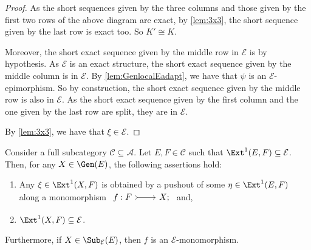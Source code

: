 \begin{proof}
As the short sequences given by the three columns and those given by the first two rows of the above diagram are exact, by \cref{lem:3x3}, the short sequence given by the last row is exact too. So $K' \cong K$. 

Moreover, the short exact sequence given by the middle row in $\mathcal{E}$ is by hypothesis. As $\mathcal{E}$ is an exact structure, the short exact sequence given by the middle column is in $\mathcal{E}$. By \cref{lem:GenlocalEadapt}, we have that $\psi$ is an $\mathcal{E}$-epimorphism. So by construction, the short exact sequence given by the middle row is also in $\mathcal{E}$. As the short exact sequence given by the first column and the one given by the last row are split, they are in $\mathcal{E}$.

By \cref{lem:3x3}, we have that $\xi \in {\mathcal{E}}$. 
\end{proof}

\begin{lemma}
\label{lem:SublocalEadapt}
Consider a full subcategory $\mathscr{C} \subseteq \mathscr{A}$. Let $E,F \in \mathscr{C}$ such that $\Ext^1(E,F) \subseteq \mathcal{E}$. Then, for any $X \in \Gen(E)$, the following assertions hold:
\begin{enumerate}[label=$(\alph*)$,itemsep=1mm]
   \item Any $\xi \in \Ext^1(X,F)$ is obtained by a pushout of some $\eta \in \Ext^1(E,F)$ along a monomorphism $ \begin{tikzcd}
	 f: F & X;
	\arrow[tail,from=1-1, to=1-2]
   \end{tikzcd}$ and,
   \item $\Ext^1(X,F) \subseteq \mathcal{E}$.
\end{enumerate}
Furthermore, if $X \in \Sub_\mathcal{E}(E)$, then $f$ is an $\mathcal{E}$-monomorphism.   
\end{lemma}


